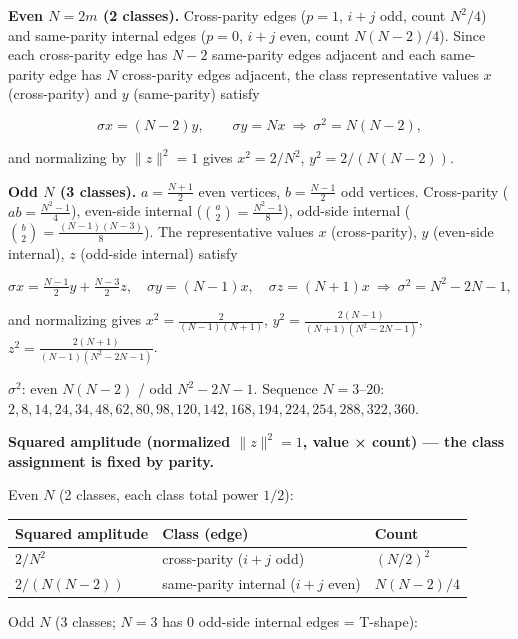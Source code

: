 \documentclass[
  a4paper,
]{ltjsarticle}
\newcounter{none} %
\begin{document}
\textbf{Even \(N=2m\) (2 classes).} Cross-parity edges (\(p=1\), \(i+j\)
odd, count \(N^2/4\)) and same-parity internal edges (\(p=0\), \(i+j\)
even, count \(N(N-2)/4\)). Since each cross-parity edge has \(N-2\)
same-parity edges adjacent and each same-parity edge has \(N\)
cross-parity edges adjacent, the class representative values \(x\)
(cross-parity) and \(y\) (same-parity) satisfy

\[\sigma x=(N-2)y,\qquad \sigma y=Nx\ \Longrightarrow\ \sigma^2=N(N-2),\]

and normalizing by \(\|z\|^2=1\) gives \(x^2=2/N^2\),
\(y^2=2/(N(N-2))\).

\textbf{Odd \(N\) (3 classes).} \(a=\tfrac{N+1}2\) even vertices,
\(b=\tfrac{N-1}2\) odd vertices. Cross-parity (\(ab=\tfrac{N^2-1}4\)),
even-side internal (\(\binom a2=\tfrac{N^2-1}8\)), odd-side internal
(\(\binom b2=\tfrac{(N-1)(N-3)}8\)). The representative values \(x\)
(cross-parity), \(y\) (even-side internal), \(z\) (odd-side internal)
satisfy

\[\sigma x=\tfrac{N-1}2y+\tfrac{N-3}2z,\quad \sigma y=(N-1)x,\quad \sigma z=(N+1)x\ \Longrightarrow\ \sigma^2=N^2-2N-1,\]

and normalizing gives \(x^2=\tfrac{2}{(N-1)(N+1)}\),
\(y^2=\tfrac{2(N-1)}{(N+1)(N^2-2N-1)}\),
\(z^2=\tfrac{2(N+1)}{(N-1)(N^2-2N-1)}\).

\textbf{\(\sigma^2\)}: even \(N(N-2)\) / odd \(N^2-2N-1\). Sequence
\(N=3\)--\(20\):
\(2,8,14,24,34,48,62,80,98,120,142,168,194,224,254,288,322,360\).

\textbf{Squared amplitude (normalized \(\|z\|^2=1\), value × count) ---
the class assignment is fixed by parity.}

Even \(N\) (2 classes, each class total power \(1/2\)):

{\def\LTcaptype{none} %
\begin{longtable}[]{@{}lll@{}}
\toprule\noalign{}
Squared amplitude & Class (edge) & Count \\
\midrule\noalign{}
\endhead
\bottomrule\noalign{}
\endlastfoot
\(2/N^2\) & cross-parity (\(i+j\) odd) & \((N/2)^2\) \\
\(2/(N(N-2))\) & same-parity internal (\(i+j\) even) & \(N(N-2)/4\) \\
\end{longtable}
}

Odd \(N\) (3 classes; \(N=3\) has 0 odd-side internal edges = T-shape):
\end{document}
